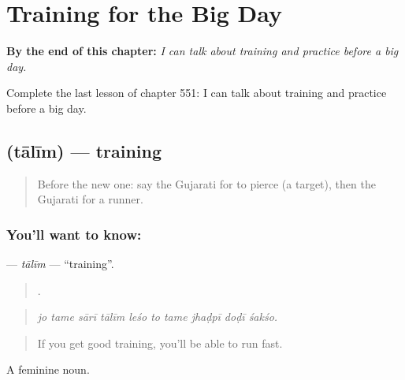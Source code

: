 
\chapter{Training for the Big Day}
\label{ch:gu-training-for-the-big-day}

\begin{chapteropening}
\textbf{By the end of this chapter:} \emph{I can talk about training and practice before a big day.}

Complete the last lesson of chapter 551: I can talk about training and practice before a big day.
\end{chapteropening}

\section[\texorpdfstring{\gu{તાલીમ} (tālīm)}{તાલીમ (tālīm)}]{ (tālīm) — training}

\label{lesson:GU-C551-talim}



\begin{quote}
Before the new one: say the Gujarati for to pierce (a target), then the Gujarati for a runner.
\end{quote}

\subsection*{You'll want to know: }
\textbf{} — \emph{tālīm} — \textquotedblleft{}training\textquotedblright{}.

\begin{quote}
         .
\end{quote}

\begin{quote}
\emph{jo tame sārī tālīm leśo to tame jhaḍpī doḍī śakśo.}
\end{quote}

\begin{quote}
If you get good training, you'll be able to run fast.
\end{quote}

A feminine noun.

